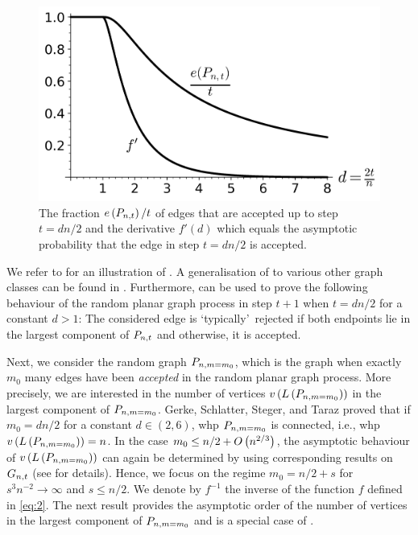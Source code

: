 \begin{figure}[t]
\centering
	\includegraphics[scale=0.505]{process.png}
	\caption{The fraction $e\left({P_{n,t}}\right)/t$ of edges that are accepted up to step $t=dn/2$ and the derivative $f'(d)$ which equals the asymptotic probability that the edge in step $t=dn/2$ is accepted.}
	\label{fig:process}
\end{figure}

We refer to  for an illustration of . A generalisation of  to various other graph classes can be found in . Furthermore,  can be used to prove the following behaviour of the random planar graph process in step $t+1$ when $t=dn/2$ for a constant $d>1$: The considered edge is \lq typically\rq\ rejected if both endpoints lie in the largest component of $P_{n,t}$ and otherwise, it is accepted. 

Next, we consider the random graph $P_{n,m=m_0}$, which is the graph when exactly $m_0$ many edges have been {\em accepted} in the random planar graph process. More precisely, we are interested in the number of vertices $v\left({L\left(P_{n,m=m_0}\right)}\right)$ in the largest component of $P_{n,m=m_0}$. Gerke, Schlatter, Steger, and Taraz \cite{GerkeSchlatterStegerTaraz2008} proved that if $m_0=dn/2$ for a constant $d\in(2,6)$, whp $P_{n,m=m_0}$ is connected, i.e., whp $v\left({L\left(P_{n,m=m_0}\right)}\right)=n$. In the case $m_0\leq n/2+O\left(n^{2/3}\right)$, the asymptotic behaviour of $v\left({L\left(P_{n,m=m_0}\right)}\right)$ can again be determined by using corresponding results on $G_{n,t}$ (see  for details). Hence, we focus on the regime $m_0=n/2+s$ for $s^3n^{-2}\to\infty$ and $s\leq n/2$. We denote by $f^{-1}$ the inverse of the function $f$ defined in \eqref{eq:2}. The next result provides the asymptotic order of the number of vertices in the largest component of $P_{n,m=m_0}$ and is a special case of .

